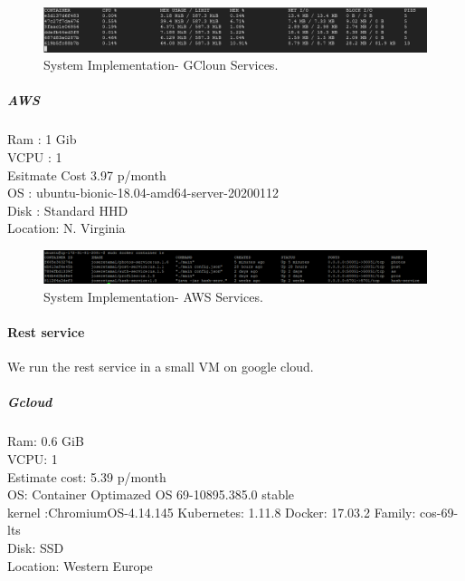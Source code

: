 \begin{figure}[H]
	\begin{center}
		\includegraphics[width=170mm,scale=1]{img/implementation/gc-ser-stats.png}
		\caption{System Implementation- GCloun Services.}
		\label{se:d4}
	\end{center}
	
\end{figure}

\subparagraph{AWS}
\indent

Ram : 1 Gib
\\
\indent
VCPU : 1
\\
\indent
Esitmate Cost 3.97 p/month
\\
\indent
OS : ubuntu-bionic-18.04-amd64-server-20200112 
\\
\indent
Disk : Standard HHD
\\
\indent
Location: N. Virginia
\\
\begin{figure}[H]
	\begin{center}
		\includegraphics[width=170mm,scale=1]{img/implementation/was-service-ls.png}
		\caption{System Implementation- AWS Services.}
		\label{se:d5}
	\end{center}
	
\end{figure}
\paragraph{Rest service}
\indent
We run the rest service in a small VM on google cloud.
\subparagraph{Gcloud}

\indent
Ram: 0.6 GiB
\\
\indent
VCPU: 1
\\
\indent
Estimate cost: 5.39 p/month
\\
\indent
OS: Container Optimazed OS 69-10895.385.0 stable
\\
\indent
kernel :ChromiumOS-4.14.145 Kubernetes: 1.11.8 Docker: 17.03.2 Family: cos-69-lts 
\\
\indent
Disk: SSD
\\
\indent
Location: Western Europe



